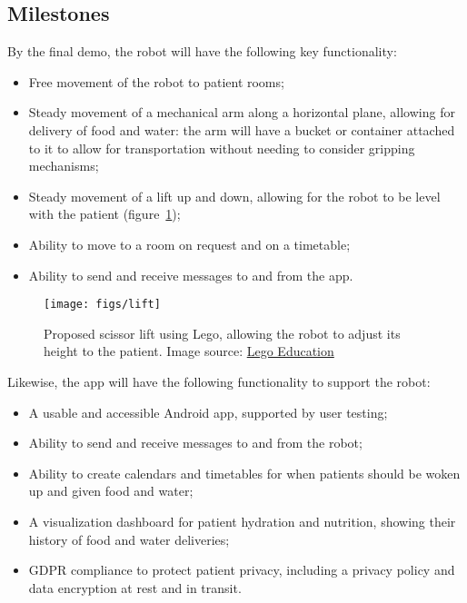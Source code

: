 \documentclass{article}
\begin{document}
\subsection{Milestones}
By the final demo, the robot will have the following key functionality:
\begin{itemize}
\item Free movement of the robot to patient rooms;
\item Steady movement of a mechanical arm along a horizontal plane, allowing for delivery of food and water: the arm will have a bucket or container attached to it to allow for transportation without needing to consider gripping mechanisms;
\item Steady movement of a lift up and down, allowing for the robot to be level with the patient (figure~\ref{fig:lift});
\item Ability to move to a room on request and on a timetable;
\item Ability to send and receive messages to and from the app. 
\end{itemize}


\begin{figure}[tb]
\vskip 5mm
\begin{center}
\centerline{\texttt{[image: figs/lift]}}
\caption{Proposed scissor lift using Lego, allowing the robot to adjust its height to the patient. Image source: \href{https://education.lego.com/en-us/lessons/pneumatics/scissor-lift}{Lego Education}}
\label{fig:lift}
\end{center}
\vskip -5mm
\end{figure}

Likewise, the app will have the following functionality to support the robot:
\begin{itemize}
\item A usable and accessible Android app, supported by user testing;
\item Ability to send and receive messages to and from the robot;
\item Ability to create calendars and timetables for when patients should be woken up and given food and water;
\item A visualization dashboard for patient hydration and nutrition, showing their history of food and water deliveries;
\item GDPR compliance to protect patient privacy, including a privacy policy and data encryption at rest and in transit. 
\end{itemize}
\end{document}
